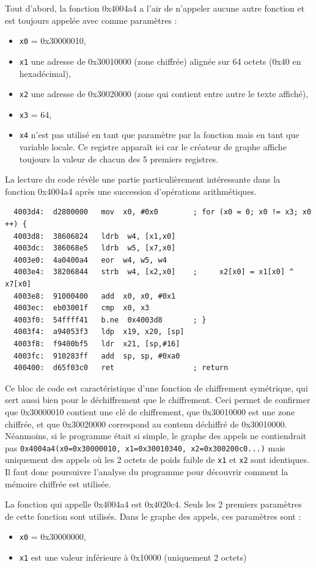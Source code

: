 \documentclass[a4paper,10pt]{article}
\begin{document}
Tout d'abord, la fonction 0x4004a4 a l'air de n'appeler aucune autre fonction et est toujours appelée avec comme paramètres :
\begin{itemize}
\item \texttt{x0} = 0x30000010,
\item \texttt{x1} une adresse de 0x30010000 (zone chiffrée) alignée sur 64 octets (0x40 en hexadécimal),
\item \texttt{x2} une adresse de 0x30020000 (zone qui contient entre autre le texte affiché),
\item \texttt{x3} = 64,
\item \texttt{x4} n'est pas utilisé en tant que paramètre par la fonction mais en tant que variable locale. Ce registre apparaît ici car le créateur de graphe affiche toujours la valeur de chacun des 5 premiers registres.
\end{itemize}

La lecture du code révèle une partie particulièrement intéressante dans la fonction 0x4004a4 après une succession d'opérations arithmétiques.

\begin{verbatim}
  4003d4:  d2800000   mov  x0, #0x0        ; for (x0 = 0; x0 != x3; x0 ++) {
  4003d8:  38606824   ldrb  w4, [x1,x0]
  4003dc:  386068e5   ldrb  w5, [x7,x0]
  4003e0:  4a0400a4   eor  w4, w5, w4
  4003e4:  38206844   strb  w4, [x2,x0]    ;     x2[x0] = x1[x0] ^ x7[x0]
  4003e8:  91000400   add  x0, x0, #0x1
  4003ec:  eb03001f   cmp  x0, x3
  4003f0:  54ffff41   b.ne  0x4003d8       ; }
  4003f4:  a94053f3   ldp  x19, x20, [sp]
  4003f8:  f9400bf5   ldr  x21, [sp,#16]
  4003fc:  910283ff   add  sp, sp, #0xa0
  400400:  d65f03c0   ret                  ; return
\end{verbatim}

Ce bloc de code est caractéristique d'une fonction de chiffrement symétrique, qui sert aussi bien pour le déchiffrement que le chiffrement. Ceci permet de confirmer que 0x30000010 contient une clé de chiffrement, que 0x30010000 est une zone chiffrée, et que 0x30020000 correspond au contenu déchiffré de 0x30010000. Néanmoins, si le programme était si simple, le graphe des appels ne contiendrait pas \texttt{0x4004a4(x0=0x30000010, x1=0x30010340, x2=0x300200c0...)} mais uniquement des appels où les 2 octets de poids faible de \texttt{x1} et \texttt{x2} sont identiques. Il faut donc poursuivre l'analyse du programme pour découvrir comment la mémoire chiffrée est utilisée.

La fonction qui appelle 0x4004a4 est 0x4020c4. Seuls les 2 premiers paramètres de cette fonction sont utilisés. Dans le graphe des appels, ces paramètres sont :
\begin{itemize}
\item \texttt{x0} = 0x30000000,
\item \texttt{x1} est une valeur inférieure à 0x10000 (uniquement 2 octets)
\end{itemize}
\end{document}
